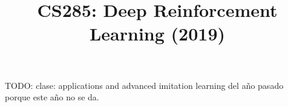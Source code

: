 \documentclass[a4paper]{report}
\title{CS285: Deep Reinforcement Learning (2019)}
\begin{document}
    \maketitle

    TODO: clase: applications and advanced imitation learning del año pasado porque este año no
    se da.

    
    
    

    \tableofcontents
\end{document}
